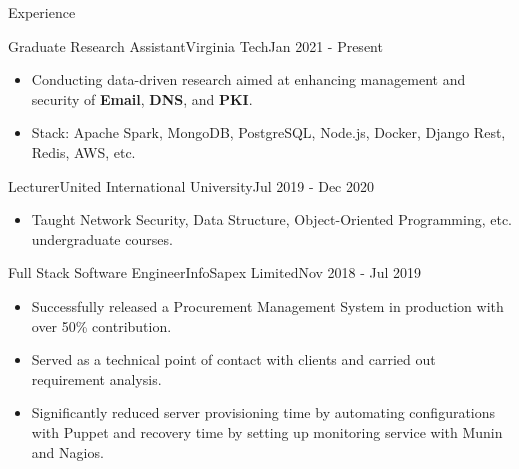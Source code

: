 \documentclass[]{mcdowellcv}
\begin{document}
	\begin{cvsection}{Experience}
		\begin{cvsubsection}{Graduate Research Assistant}{Virginia Tech}{Jan 2021 - Present}
			\begin{itemize}
				\item Conducting data-driven research aimed at enhancing management and security of \textbf{Email}, \textbf{DNS}, and \textbf{PKI}.
				\item Stack: Apache Spark, MongoDB, PostgreSQL, Node.js, Docker, Django Rest, Redis, AWS, etc.
			\end{itemize}
		\end{cvsubsection}

		\begin{cvsubsection}{Lecturer}{United International University}{Jul 2019 - Dec 2020}
			\begin{itemize}
				\item Taught Network Security, Data Structure, Object-Oriented Programming, etc. undergraduate courses.
			\end{itemize}
		\end{cvsubsection}
		\begin{cvsubsection}{Full Stack Software Engineer}{InfoSapex Limited}{Nov 2018 - Jul 2019}
			\begin{itemize}
				\item Successfully released a Procurement Management System in production with over 50\% contribution.
				\item Served as a technical point of contact with clients and carried out requirement analysis.
				\item Significantly reduced server provisioning time by automating configurations with Puppet and recovery time by setting up monitoring service with Munin and Nagios.
			\end{itemize}
		\end{cvsubsection}

	\end{cvsection}
\end{document}
